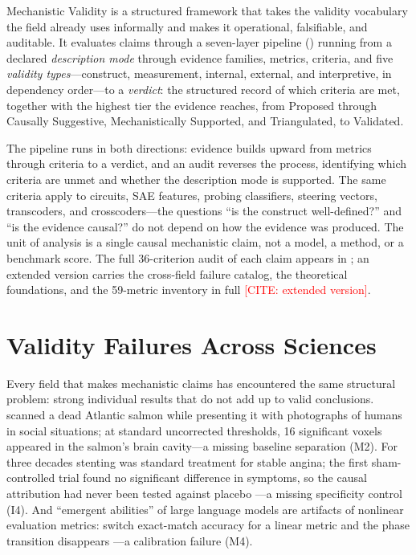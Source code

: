 \documentclass{article}
\begin{document}
Mechanistic Validity is a structured framework that takes the validity vocabulary the field already uses informally and makes it operational, falsifiable, and auditable. It evaluates claims through a seven-layer pipeline () running from a declared \emph{description mode} through evidence families, metrics, criteria, and five \emph{validity types}---construct, measurement, internal, external, and interpretive, in dependency order---to a \emph{verdict}: the structured record of which criteria are met, together with the highest tier the evidence reaches, from Proposed through Causally Suggestive, Mechanistically Supported, and Triangulated, to Validated.

The pipeline runs in both directions: evidence builds upward from metrics through criteria to a verdict, and an audit reverses the process, identifying which criteria are unmet and whether the description mode is supported. The same criteria apply to circuits, SAE features, probing classifiers, steering vectors, transcoders, and crosscoders---the questions ``is the construct well-defined?'' and ``is the evidence causal?'' do not depend on how the evidence was produced. The unit of analysis is a single causal mechanistic claim, not a model, a method, or a benchmark score. The full 36-criterion audit of each claim appears in ; an extended version carries the cross-field failure catalog, the theoretical foundations, and the 59-metric inventory in full \textcolor{red}{[CITE: extended version]}.

\section{Validity Failures Across Sciences}
\label{sec:motivation}

Every field that makes mechanistic claims has encountered the same structural problem: strong individual results that do not add up to valid conclusions. \citet{bennett2010neural} scanned a dead Atlantic salmon while presenting it with photographs of humans in social situations; at standard uncorrected thresholds, 16 significant voxels appeared in the salmon's brain cavity---a missing baseline separation (M2). For three decades stenting was standard treatment for stable angina; the first sham-controlled trial found no significant difference in symptoms, so the causal attribution had never been tested against placebo \citep{alhabib2018orbita}---a missing specificity control (I4). And ``emergent abilities'' of large language models are artifacts of nonlinear evaluation metrics: switch exact-match accuracy for a linear metric and the phase transition disappears \citep{schaeffer2023emergent}---a calibration failure (M4).
\end{document}
